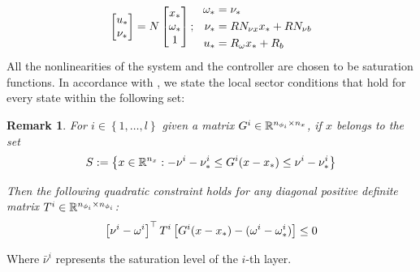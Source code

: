 \documentclass{ifacconf}
\theoremstyle{plain}
\newtheorem{remark}{Remark}
\begin{document}
\begin{equation}\label{eqn:equilibrium}
  \left[\begin{matrix}u_* \\ \nu_*\end{matrix}\right] = N \left[\begin{matrix}x_* \\ \omega_* \\ 1\end{matrix}\right]; \ \  
  \begin{aligned}
    \omega_* &= \nu_*\\
    \nu_* &= R N_{\nu x} x_* + R N_{\nu b}\\
    u_* &= R_{\omega} x_* + R_b
  \end{aligned}
\end{equation}
All the nonlinearities of the system and the controller are chosen to be saturation functions. In accordance with \citep[Lemma 3]{css-extended}, we state the local sector conditions that hold for every state within the following set:
\begin{remark}\label{rem:sec-set}
\emph{For $i \in \left\{ 1, \dots, l \right\}$ given a matrix $G^i \in {\mathbb{R}}^{n_{\phi_i} \times n_x}$, if $x$ belongs to the set}
\begin{equation}\label{eqn:inclusion-set}
S := \left\{ x \in {\mathbb{R}}^{n_x} : -\relax{\nu}^i - \relax{\nu}^i_* \leq G^i (x - x_*) \leq \relax{\nu}^i - \nu_*^i \right\} 
\end{equation}

\emph{Then the following quadratic constraint holds for any diagonal positive definite matrix $T^i \in {\mathbb{R}}^{n_{\phi_i} \times n_{\phi_i}}$:}
\begin{equation}\label{eqn:first_sec_cond}
  \left[ \nu^i - \omega^i \right]^\top T^i \left[ G^i (x - x_*) - (\omega^i - \omega^i_*) \right] \leq 0
\end{equation}\end{remark}
Where $\bar{\nu}^i$ represents the saturation level of the $i$-th layer.
\end{document}
